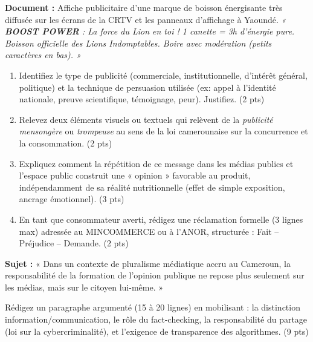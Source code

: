 \documentclass[11pt]{article}
\begin{document}
\begin{exercice}
\textbf{Document :} Affiche publicitaire d'une marque de boisson énergisante très diffusée sur les écrans de la CRTV et les panneaux d'affichage à Yaoundé. \textit{« \textbf{BOOST POWER} : La force du Lion en toi ! 1 canette = 3h d'énergie pure. Boisson officielle des Lions Indomptables. \textit{Boire avec modération} (petits caractères en bas). »}

\begin{enumerate}
    \item Identifiez le type de publicité (commerciale, institutionnelle, d'intérêt général, politique) et la technique de persuasion utilisée (ex: appel à l'identité nationale, preuve scientifique, témoignage, peur). Justifiez. (2 pts)
    \item Relevez deux éléments visuels ou textuels qui relèvent de la \textit{publicité mensongère} ou \textit{trompeuse} au sens de la loi camerounaise sur la concurrence et la consommation. (2 pts)
    \item Expliquez comment la répétition de ce message dans les médias publics et l'espace public construit une « opinion » favorable au produit, indépendamment de sa réalité nutritionnelle (effet de simple exposition, ancrage émotionnel). (3 pts)
    \item En tant que consommateur averti, rédigez une réclamation formelle (3 lignes max) adressée au MINCOMMERCE ou à l'ANOR, structurée : Fait -- Préjudice -- Demande. (2 pts)
\end{enumerate}
\end{exercice}

\begin{exercice}
\textbf{Sujet :} « Dans un contexte de pluralisme médiatique accru au Cameroun, la responsabilité de la formation de l'opinion publique ne repose plus seulement sur les médias, mais sur le citoyen lui-même. »

Rédigez un paragraphe argumenté (15 à 20 lignes) en mobilisant : la distinction information/communication, le rôle du fact-checking, la responsabilité du partage (loi sur la cybercriminalité), et l'exigence de transparence des algorithmes. (9 pts)
\end{exercice}
\end{document}
